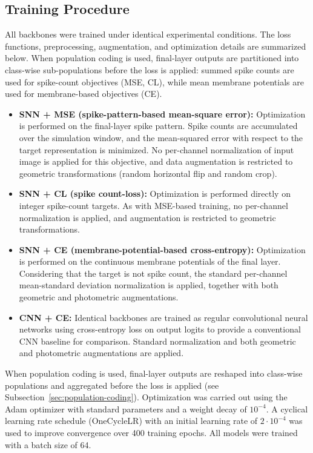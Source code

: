 \documentclass{ieeeaccess}
\begin{document}
\subsection{Training Procedure}
All backbones were trained under identical experimental conditions. The loss functions, preprocessing, augmentation, and optimization details are summarized below. When population coding is used, final-layer outputs are partitioned into class-wise sub-populations before the loss is applied: summed spike counts are used for spike-count objectives (MSE, CL), while mean membrane potentials are used for membrane-based objectives (CE).

\begin{itemize}
\item \textbf{SNN + MSE (spike-pattern-based mean-square error):} Optimization is performed on the final-layer spike pattern. Spike counts are accumulated over the simulation window, and the mean-squared error with respect to the target representation is minimized. No per-channel normalization of input image is applied for this objective, and data augmentation is restricted to geometric transformations (random horizontal flip and random crop).

\item \textbf{SNN + CL (spike count-loss):} Optimization is performed directly on integer spike-count targets. As with MSE-based training, no per-channel normalization is applied, and augmentation is restricted to geometric transformations.

\item \textbf{SNN + CE (membrane-potential-based cross-entropy):} Optimization is performed on the continuous membrane potentials of the final layer. Considering that the target is not spike count, the standard per-channel mean-standard deviation normalization is applied, together with both geometric and photometric augmentations.

\item \textbf{CNN + CE:} Identical backbones are trained as regular convolutional neural networks using cross-entropy loss on output logits to provide a conventional CNN baseline for comparison. Standard normalization and both geometric and photometric augmentations are applied.
\end{itemize}

When population coding is used, final-layer outputs are reshaped into class-wise populations and aggregated before the loss is applied (see Subsection~\ref{sec:population-coding}). Optimization was carried out using the Adam optimizer with standard parameters and a weight decay of $10^{-4}$. A cyclical learning rate schedule (OneCycleLR) with an initial learning rate of $2\cdot10^{-4}$ was used to improve convergence over 400 training epochs. All models were trained with a batch size of 64.
\end{document}
